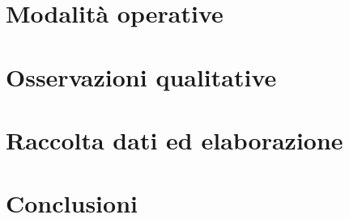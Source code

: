 \documentclass[10pt,a4paper]{article}
\begin{document}
\section{Modalità operative}

\section{Osservazioni qualitative}

\section{Raccolta dati ed elaborazione}


\section{Conclusioni}
\end{document}
